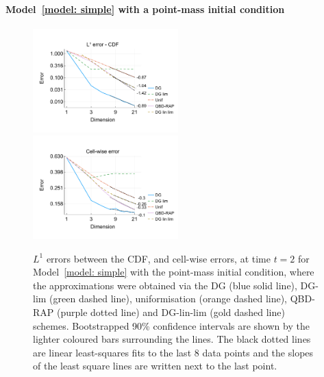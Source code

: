 \paragraph{Model~\ref{model: simple} with a point-mass initial condition}
\begin{figure}[h]
	\centering
	\includegraphics[width=0.5\textwidth,trim={0.75cm 0.8cm 0.25cm 1.25cm},clip]{chapter6/figs/hitting_times_model/reflecting_model/transient_distribution/point_mass/l1_cdf_error_formatted.pdf}%
	\includegraphics[width=0.5\textwidth,trim={0.75cm 0.8cm 0.25cm 1.25cm},clip]{chapter6/figs/hitting_times_model/reflecting_model/transient_distribution/point_mass/L1_cell_probs_error_formatted.pdf}
	\caption{\(L^1\) errors between the CDF, and cell-wise errors, at time \(t=2\) for Model~\ref{model: simple} with the point-mass initial condition, where the approximations were obtained via the DG (blue solid line), DG-lim (green dashed line), uniformisation (orange dashed line), QBD-RAP (purple dotted line) and DG-lin-lim (gold dashed line) schemes. Bootstrapped 90\% confidence intervals are shown by the lighter coloured bars surrounding the lines. The black dotted lines are linear least-squares fits to the last 8 data points and the slopes of the least square lines are written next to the last point.} 
	\label{fig: reflecting transient pm} 
\end{figure}
